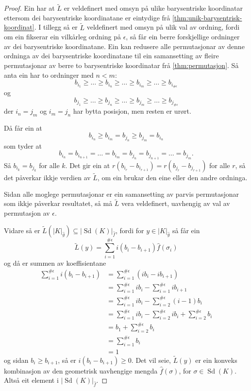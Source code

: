 \documentclass[a4paper, 12pt, norsk]{article}
\theoremstyle{plain}
\theoremstyle{definition}
\newcommand{\gr}[1]{ \lvert #1 \rvert } %
\newcommand{\tuple}[1]{ \left( #1 \right) } %
\DeclareMathOperator{\Sd}{Sd} %
\begin{document}
\begin{proof}
	Ein har at \( \tilde{L} \) er veldefinert med omsyn på ulike barysentriske koordinatar ettersom dei barysentriske koordinatane er eintydige frå \autoref{thm:unik-barysentrisk-koordinat}. I tillegg så er \( \tilde{L} \) veldefinert med omsyn på ulik val av ordning, fordi om ein fikserar ein vilkårleg ordning på \( \epsilon \), så får ein berre forskjellige ordninger av dei barysentriske koordinatane. Ein kan redusere alle permutasjonar av denne ordninga av dei barysentriske koordinatane til ein samansetting av fleire permutasjonar av berre to barysentriske koordinatar frå \autoref{thm:permutasjon}. Så anta ein har to ordninger med \( n < m \):
	\[
		b_{i_1} \geq \dots \geq b_{i_n} \geq \dots \geq b_{i_m} \geq \dots \geq b_{i_{\#\epsilon}}
	\]
	og
	\[
		b_{j_1} \geq \dots \geq b_{j_n} \geq \dots \geq b_{j_m} \geq \dots \geq b_{j_{\#\epsilon}}
	\]
	der \( i_n=j_m \) og \( i_m=j_n \) har bytta posisjon, men resten er urørt. 
	
	Då får ein at 
	\[ 
		b_{i_n} \geq b_{i_m}=b_{j_n} \geq b_{j_m}=b_{i_n}
	\] 
	som tyder at 
	\[ 
		b_{i_n} = b_{i_{n+1}} = \dots = b_{i_m}=b_{j_n}=b_{j_{n+1}}=\dots=b_{j_m}.
	\]
	Så \( b_{i_k} = b_{j_k} \) for alle \( k \). Det gir ein at \( r\tuple{b_{i_r}-b_{i_{r+1}}} = r\tuple{b_{j_r}-b_{j_{r+1}}} \) for alle \( r \), så det påverkar ikkje verdien av \( \tilde{L} \), om ein brukar den eine eller den andre ordninga.

	Sidan alle moglege permutasjonar er ein samansetting av parvis permutasjonar som ikkje påverkar resultatet, så må \( \tilde{L} \) vera veldefinert, uavhengig av val av permutasjon av \( \epsilon \).

	Vidare så er \( \tilde{L}(\gr{K}_{\hat{g}}) \subseteq \gr{\Sd(K)}_{\hat{f}} \), fordi for \( y \in \gr{K}_{\hat{g}} \) så får ein
	\[
		\tilde{L}(y) = \sum_{i=1}^{\#\epsilon}i\tuple{b_i-b_{i+1}}\hat{f}(\sigma_i)
	\]
	og då er summen av koeffisientane
	\begin{align*}
		\sum_{i=1}^{\#\epsilon}i\tuple{b_i-b_{i+1}} &= \sum_{i=1}^{\#\epsilon}\tuple{ib_i-ib_{i+1}} \\
		&= \sum_{i=1}^{\#\epsilon}i b_i - \sum_{i=1}^{\#\epsilon}i b_{i+1} \\
		&= \sum_{i=1}^{\#\epsilon}i b_i - \sum_{i=2}^{\#\epsilon}\tuple{i-1}b_{i} \\
		&= \sum_{i=1}^{\#\epsilon}i b_i - \sum_{i=2}^{\#\epsilon}i b_{i} + \sum_{i=2}^{\#\epsilon}b_i \\
		&= b_1 + \sum_{i=2}^{\#\epsilon} b_i \\
		&= \sum_{i=1}^{\#\epsilon} b_i \\
		&= 1
	\end{align*}
	og sidan \( b_i \geq b_{i+1} \), så er \( i\tuple{b_i-b_{i+1}} \geq 0 \). Det vil seie, \( \tilde{L}(y) \) er ein konveks kombinasjon av den geometrisk uavhengige mengda \( \hat{f}(\sigma) \), for \( \sigma \in \Sd(K) \). Altså eit element i \( \gr{\Sd(K)}_{\hat{f}} \).


\end{proof}
\end{document}
